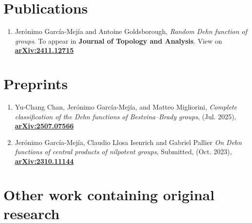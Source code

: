 \documentclass[a4paper,11pt]{article} %
\begin{document}

\section{Publications}

\begin{minipage}{15cm}
\begin{enumerate}[align=right, itemsep=.5em, leftmargin=1.8em]
	
	\item Jerónimo García-Mejía and Antoine Goldsborough, \emph{Random Dehn function of groups}. To appear in \textbf{Journal of Topology and Analysis}. View on {\href{https://arxiv.org/abs/2411.12715}{\textbf{arXiv:2411.12715}}}
    
\end{enumerate}
\end{minipage}

\section{Preprints}

\begin{minipage}{15cm}
\begin{enumerate}[align=right, itemsep=.5em, leftmargin=1.8em]
	
	\item Yu-Chang Chan, Jerónimo García-Mejía, and Matteo Migliorini, \emph{Complete classification of the Dehn functions of Bestvina--Brady groups}, (Jul. 2025), {\href{https://arxiv.org/abs/2507.07566}{\textbf{arXiv:2507.07566}}}
    
    \item Jerónimo García-Mejía, Claudio Llosa Isenrich and Gabriel Pallier \emph{On Dehn functions of central products of nilpotent groups}, Submitted,  (Oct. 2023), {\href{https://arxiv.org/abs/2310.11144}{\textbf{arXiv:2310.11144}}}
    
\end{enumerate}
\end{minipage}

\section{Other work containing original research}
\end{document}
